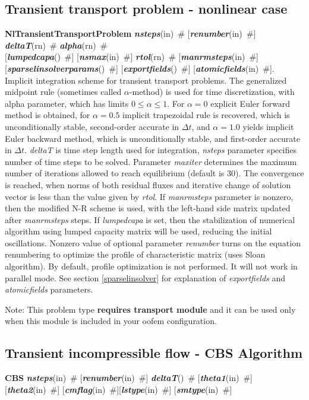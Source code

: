 \documentclass[draft]{article}
\newcommand{\param}[1]{{\em #1}}
\newcommand{\keywordnotype}[1]{\mbox{{\it{\bf{#1}}}}}
\newcommand{\keyword}[2]{\mbox{{\keywordnotype{#1}\tiny (#2)}}}
\newcommand{\entKeywordInst}[1]{\mbox{{\bf{{#1}}}}}
\newcommand{\field}[2]{\mbox{\keyword{#1}{#2}~\#}}
\newcommand{\optField}[2]{\mbox{[\field{#1}{#2}]}}
\begin{document}
\subsection{Transient transport problem - nonlinear case}
\label{TransientTransport}
\entKeywordInst{NlTransientTransportProblem} \field{nsteps}{in} \optField{renumber}{in}
\field{deltaT}{rn} \field{alpha}{rn}\\ \optField{lumpedcapa}{}
\optField{nsmax}{in} \field{rtol}{rn} \optField{manrmsteps}{in}\\
\optField{sparselinsolverparams}{}
\optField{exportfields}{} \optField{atomicfields}{in}.\\
Implicit
integration scheme for transient transport problems. The generalized
midpoint rule (sometimes called $\alpha$-method) is used for time discretization, with alpha parameter,
which has limits $0\le\alpha\le1$. For $\alpha=0$ explicit Euler
forward method is obtained, for $\alpha=0.5$ implicit trapezoidal rule
is recovered, which is unconditionally stable, second-order accurate
in $\Delta t$, and $\alpha=1.0$ yields implicit Euler backward method,
which is unconditionally stable, and first-order accurate
in $\Delta t$. \param{deltaT} is time step length used for
integration, \param{nsteps} parameter specifies
number of time steps to be solved. Parameter \param{maxiter} determines the maximum
number of iterations allowed to reach equilibrium (default is 30). 
The convergence is reached, when norms of both residual fluxes and iterative
change of solution vector is less than the value given by \param{rtol}.
If \param{manrmsteps} parameter is nonzero, then the modified
N-R scheme is used, with the left-hand side matrix updated after
\param{manrmsteps} steps.
If \param{lumpedcapa} is set, then the stabilization of numerical
algorithm using lumped capacity matrix will be used, reducing the
initial oscillations.
Nonzero value of optional parameter \param{renumber} turns on the
equation renumbering to optimize the profile of characteristic matrix
(uses Sloan algorithm). By default, profile optimization is not
performed. It will not work in parallel mode.
See section \ref{sparselinsolver} for explanation of
\param{exportfields} and \param{atomicfields} parameters.

Note: This problem type {\bf requires transport module} and it
can be used only when this module is included in your oofem
configuration.

\subsection{Transient incompressible flow - CBS Algorithm}
\label{cbsIncomp}
\entKeywordInst{CBS} \field{nsteps}{in} \optField{renumber}{in}
\field{deltaT}{} \optField{theta1}{in} \optField{theta2}{in} \optField{cmflag}{in}\newline
[\field{scaleflag}{in} \field{lscale}{in}
  \field{uscale}{in}\field{dscale}{in}]\newline \optField{lstype}{in} \optField{smtype}{in}
\end{document}
